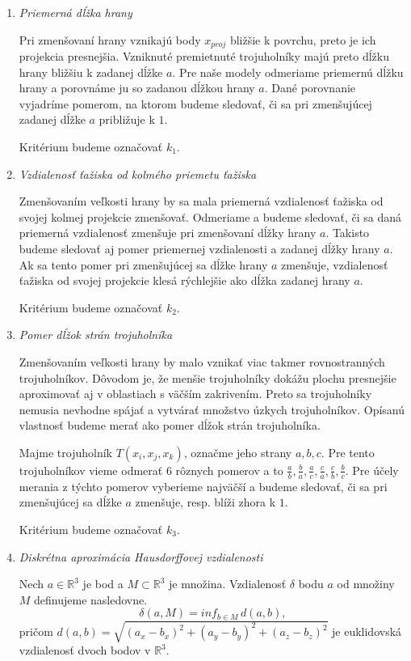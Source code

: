 \begin{enumerate}
\item{
    \textit{Priemerná dĺžka hrany}

    Pri zmenšovaní hrany vznikajú body $x_{proj}$ bližšie k povrchu, preto je ich projekcia
    presnejšia. Vzniknuté premietnuté trojuholníky majú preto dĺžku hrany bližšiu k zadanej dĺžke 
    $a$. Pre naše modely odmeriame priemernú dĺžku hrany a porovnáme ju so zadanou dĺžkou hrany $a$. 
    Dané porovnanie vyjadríme 
    pomerom, na ktorom budeme sledovať, či sa pri zmenšujúcej zadanej dĺžke $a$ približuje k $1$.

    Kritérium budeme označovať $k_1$.
}
\item{
    \textit{Vzdialenosť ťažiska od kolmého priemetu ťažiska}

    Zmenšovaním veľkosti hrany by sa mala priemerná vzdialenosť ťažiska od svojej kolmej 
    projekcie zmenšovať. Odmeriame a budeme sledovať, či sa daná priemerná vzdialenosť
    zmenšuje pri zmenšovaní dĺžky hrany $a$. Takisto budeme sledovať aj pomer priemernej 
    vzdialenosti a zadanej dĺžky hrany $a$. Ak sa tento pomer pri zmenšujúcej sa dĺžke hrany 
    $a$ zmenšuje, vzdialenosť 
    ťažiska od svojej projekcie klesá rýchlejšie ako dĺžka zadanej hrany $a$.

    Kritérium budeme označovať $k_2$.
}
\item{
    \textit{Pomer dĺžok strán trojuholníka}

    Zmenšovaním veľkosti hrany by malo vznikať viac takmer rovnostranných trojuholníkov.
    Dôvodom je, že menšie trojuholníky dokážu plochu presnejšie aproximovať aj v oblastiach 
    s väčším zakrivením. Preto sa trojuholníky nemusia nevhodne spájať a vytvárať množstvo 
    úzkych trojuholníkov. Opísanú vlastnosť budeme merať ako pomer dĺžok strán trojuholníka. 
    
    Majme trojuholník $T(x_i, x_j, x_k)$, označme jeho strany $a, b, c$. Pre tento trojuholníkov 
    vieme odmerať 6 rôznych pomerov a to 
    $\frac{a}{b}, \frac{b}{a}, \frac{a}{c}, \frac{c}{a}, \frac{c}{b}, \frac{b}{c}$.
    Pre účely merania z týchto pomerov vyberieme najväčší a budeme sledovať, či sa pri 
    zmenšujúcej sa dĺžke $a$ zmenšuje, resp. blíži zhora k $1$.

    Kritérium budeme označovať $k_3$.
}
\item{
    \textit{Diskrétna aproximácia Hausdorffovej vzdialenosti}

    \begin{definition}
        Nech $a \in \mathbb{R}^3$ je bod a $M \subset \mathbb{R}^3$ je množina.
        Vzdialenosť $\delta$ bodu $a$ od množiny $M$ definujeme nasledovne.
        \begin{equation}
            \delta(a, M) = inf_{b \in M} \, d(a, b),
        \end{equation}
        pričom $d(a, b) = \sqrt{(a_x-b_x)^2 + (a_y-b_y)^2 + (a_z-b_z)^2}$ je euklidovská 
        vzdialenosť dvoch bodov v $\mathbb{R}^3$.
    \end{definition}

}
\end{enumerate}
